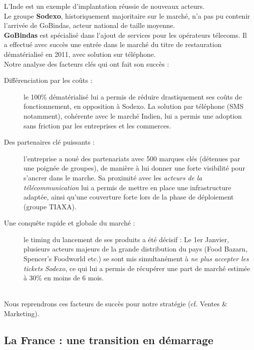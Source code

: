 L’Inde est un exemple d’implantation réussie de nouveaux acteurs. \\

Le groupe \textbf{Sodexo}, historiquement majoritaire sur le marché, n’a pas pu
contenir l’arrivée de GoBindas, acteur national de taille moyenne. \\

\textbf{GoBindas} est spécialisé dans l’ajout de services pour les opérateurs
télecoms. Il a effectué avec succès une entrée dans le marché du titre de
restauration dématérialisé en 2011, avec solution sur téléphone. \\

Notre analyse des facteurs clés qui ont fait son succès : \\
\begin{description}
  \item[Différenciation par les coûts :] le 100\% dématérialisé lui a permis de
    réduire drastiquement ses coûts de fonctionnement, en opposition à Sodexo. La
    solution par téléphone (SMS notamment), cohérente avec le marché Indien, lui
    a permis une adoption sans friction par les entreprises et les commerces.
  \item[Des partenaires clé puissants :] l’entreprise a noué des partenariats
    avec 500 marques clés (détenues par une poignée de groupes), de manière à lui
    donner une forte visibilité pour s’ancrer dans le marche. Sa proximité avec
    les \textit{acteurs de la télécommunication} lui a permis de mettre en place
    une infrastructure adaptée, ainsi qu’une couverture forte lors de la phase de
    déploiement (groupe TIAXA). 
  \item[Une conquête rapide et globale du marché :] le timing du lancement de ses
    produits a été décisif : Le 1er Janvier, plusieurs acteurs majeurs de la
    grande distribution du pays (Food Bazarn, Spencer's Foodworld etc.) se sont
    mis simultanément à \textit{ne plus accepter les tickets Sodexo}, ce qui lui
    a permis de récupérer une part de marché estimée à 30\% en moins de 6 mois.
\end{description}
~\\

Nous reprendrons ces facteurs de succès pour notre stratégie (cf. Ventes \&
Marketing). \\

\subsection{La France : une transition en démarrage}

